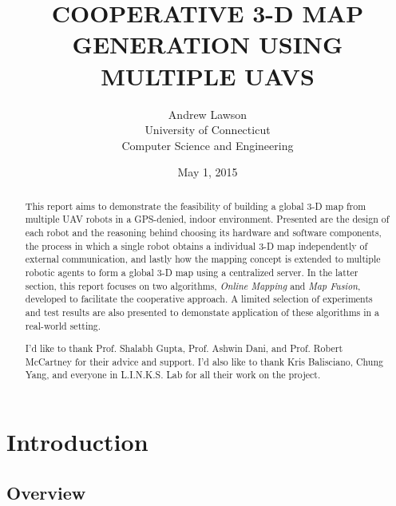 \documentclass[letterpaper, oneside, 10pt]{report}
\title{\large COOPERATIVE 3-D MAP GENERATION USING MULTIPLE UAVS}
\author{
  \large
  Andrew Lawson \\
  University of Connecticut \\
  Computer Science and Engineering
}
\date{\large May 1, 2015}
\begin{document}
\begin{titlepage}
  \maketitle
  \thispagestyle{empty}
\end{titlepage}
\clearpage

\begin{abstract}

\noindent This report aims to demonstrate the feasibility of building a global 3-D map from multiple UAV robots in a GPS-denied, indoor environment. Presented are the design of each robot and the reasoning behind choosing its hardware and software components, the process in which a single robot obtains a individual 3-D map independently of external communication, and lastly how the mapping concept is extended to multiple robotic agents to form a global 3-D map using a centralized server. In the latter section, this report focuses on two algorithms, \textsl{Online Mapping} and \textsl{Map Fusion}, developed to facilitate the cooperative approach. A limited selection of experiments and test results are also presented to demonstate application of these algorithms in a real-world setting.

\end{abstract}
\clearpage

\renewcommand{\abstractname}{Acknowledgements}
\begin{abstract}
 I'd like to thank Prof. Shalabh Gupta, Prof. Ashwin Dani, and Prof. Robert McCartney for their advice and support. I'd also like to thank Kris Balisciano, Chung Yang, and everyone in L.I.N.K.S. Lab for all their work on the project.
\end{abstract}
\clearpage

\tableofcontents
\listoffigures
\listoftables
\clearpage

\doublespacing

\chapter{Introduction}

\section{Overview}
\end{document}
